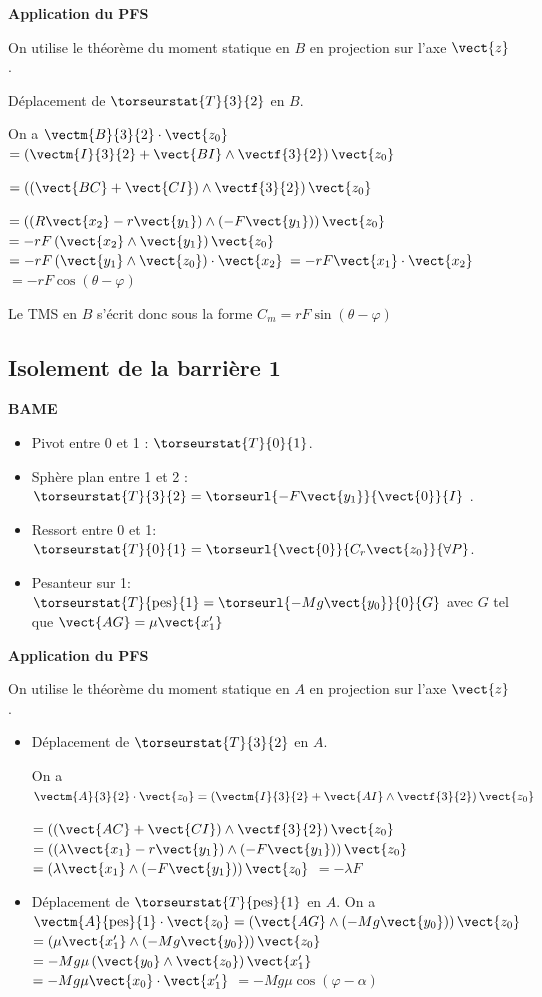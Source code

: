 \textbf{Application du PFS}

On utilise le théorème du moment statique en $B$ en projection sur l'axe $\vect{z}$.

Déplacement de  $\torseurstat{T}{3}{2}$ en $B$.

On a $\vectm{B}{3}{2}\cdot\vect{z_0}$ 
$=\left(\vectm{I}{3}{2}+\vect{BI}\wedge\vectf{3}{2}\right)\vect{z_0}$

$=\left(\left(\vect{BC}+\vect{CI}\right)\wedge\vectf{3}{2}\right)\vect{z_0}$

$=\left(\left(R\vect{x_2}-r\vect{y_1}\right)\wedge\left(-F\vect{y_1}\right)\right)\vect{z_0}$
$=-rF\left(\vect{x_2}\wedge\vect{y_1}\right)\vect{z_0}$
$=-rF\left(\vect{y_1}\wedge\vect{z_0}\right)\cdot\vect{x_2}$
$=-rF\vect{x_1}\cdot\vect{x_2}$
$=-rF\cos\left( \theta-\varphi\right)$

Le TMS en $B$ s'écrit donc sous la forme 
$C_m=rF\sin\left( \theta-\varphi\right)$


\subsection{Isolement de la barrière 1}

\textbf{BAME}
\begin{itemize}
\item Pivot entre 0 et 1 : $\torseurstat{T}{0}{1}$.
\item Sphère plan entre 1 et 2 : $\torseurstat{T}{3}{2}= \torseurl{-F\vect{y_1}}{\vect{0}}{I}$ .
\item Ressort entre 0 et 1: $\torseurstat{T}{0}{1}= \torseurl{\vect{0}}{C_r\vect{z_0}}{\forall P}$.
\item Pesanteur sur 1: $\torseurstat{T}{\text{pes}}{1}= \torseurl{-Mg\vect{y_0}}{0}{G}$ avec $G$ tel que $\vect{AG}=\mu\vect{x_{1}'}$
\end{itemize}

\textbf{Application du PFS}

On utilise le théorème du moment statique en $A$ en projection sur l'axe $\vect{z}$.

\begin{itemize}
\item Déplacement de  $\torseurstat{T}{3}{2}$ en $A$.

On a $\vectm{A}{3}{2}\cdot\vect{z_0} =\left(\vectm{I}{3}{2}+\vect{AI}\wedge\vectf{3}{2}\right)\vect{z_0}$

$=\left(\left(\vect{AC}+\vect{CI}\right)\wedge\vectf{3}{2}\right)\vect{z_0}$
$=\left(\left(\lambda \vect{x_1}-r\vect{y_1}\right)\wedge\left(-F\vect{y_1}\right)\right)\vect{z_0}$
$=\left(\lambda \vect{x_1}\wedge\left(-F\vect{y_1}\right)\right)\vect{z_0}$
$=-\lambda F$

\item Déplacement de  $\torseurstat{T}{\text{pes}}{1}$ en $A$.
On a $\vectm{A}{\text{pes}}{1}\cdot\vect{z_0} =\left(\vect{AG}\wedge \left(-Mg\vect{y_0}\right)\right)\vect{z_0}$
$=\left(\mu \vect{x_1'}\wedge \left(-Mg\vect{y_0}\right)\right)\vect{z_0}$
$=-Mg \mu \left(\vect{y_0} \wedge \vect{z_0}\right)\vect{x_1'}$
$=-Mg \mu \vect{x_0}\cdot \vect{x_1'}$
$=-Mg \mu \cos\left( \varphi - \alpha \right)$
\end{itemize}


